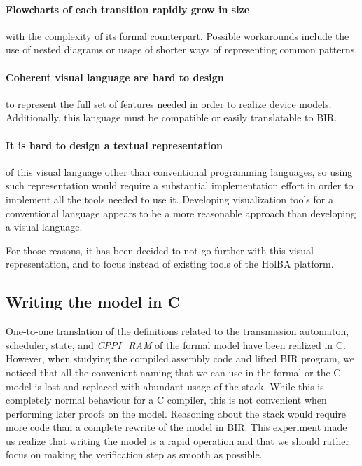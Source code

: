 \documentclass[10pt,a4paper]{article}
\begin{document}
\begin{multicols}{2}
\paragraph{Flowcharts of each transition rapidly grow in size} with the complexity of its formal counterpart. Possible workarounds include the use of nested diagrams or usage of shorter ways of representing common patterns.

\paragraph{Coherent visual language are hard to design} to represent the full set of features needed in order to realize device models. Additionally, this language must be compatible or easily translatable to BIR.

\paragraph{It is hard to design a textual representation} of this visual language other than conventional programming languages, so using such representation would require a substantial implementation effort in order to implement all the tools needed to use it. Developing visualization tools for a conventional language appears to be a more reasonable approach than developing a visual language.

\medskip
For those reasons, it has been decided to not go further with this visual representation, and to focus instead of existing tools of the HolBA platform.

\subsection{Writing the model in C} \label{c-model}

One-to-one translation of the definitions related to the transmission automaton, scheduler, state, and \textit{CPPI\_RAM} of the formal model have been realized in C. However, when studying the compiled assembly code and lifted BIR program, we noticed that all the convenient naming that we can use in the formal or the C model is lost and replaced with abundant usage of the stack. While this is completely normal behaviour for a C compiler, this is not convenient when performing later proofs on the model. Reasoning about the stack would require more code than a complete rewrite of the model in BIR. This experiment made us realize that writing the model is a rapid operation and that we should rather focus on making the verification step as smooth as possible.


\end{multicols}
\end{document}
